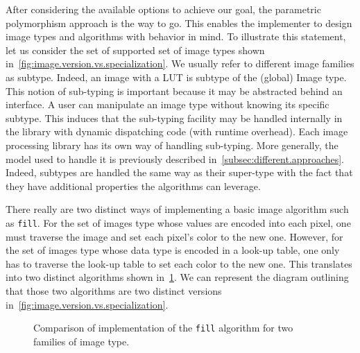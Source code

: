 After considering the available options to achieve our goal, the parametric polymorphism approach is the way to go. This
enables the implementer to design image types and algorithms with behavior in mind. To illustrate this statement, let us
consider the set of supported set of image types shown in~\cref{fig:image.version.vs.specialization}. We usually refer
to different image families as subtype. Indeed, an image with a LUT is subtype of the (global) Image type. This notion
of sub-typing is important because it may be abstracted behind an interface. A user can manipulate an image type without
knowing its specific subtype. This induces that the sub-typing facility may be handled internally in the library with
dynamic dispatching code (with runtime overhead). Each image processing library has its own way of handling sub-typing.
More generally, the model used to handle it is previously described in~\cref{subsec:different.approaches}. Indeed,
subtypes are handled the same way as their super-type with the fact that they have additional properties the algorithms
can leverage.



There really are two distinct ways of implementing a basic image algorithm such as \texttt{fill}. For the set of images
type whose values are encoded into each pixel, one must traverse the image and set each pixel's color to the new one.
However, for the set of images type whose data type is encoded in a look-up table, one only has to traverse the look-up
table to set each color to the new one. This translates into two distinct algorithms shown
in~\cref{fig:traverse.vs.LUT}. We can represent the diagram outlining that those two algorithms are two distinct
versions in~\cref{fig:image.version.vs.specialization}.

\begin{figure}[htbp]
  \centering
  \hfil

  \caption{Comparison of implementation of the \texttt{fill} algorithm for two
    families of image type.}
  \label{fig:traverse.vs.LUT}
\end{figure}

